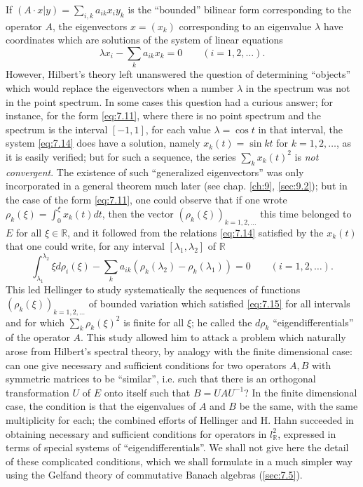 \documentclass[12pt,a4paper,leqno,twoside]{extbook}
\newcommand{\R}{\mathbb{R}}
\begin{document}
If \((A \cdot x|y) = \sum\limits_{i,k} a_{ik} x_i y_k\) is the ``bounded'' bilinear form corresponding to the operator \(A\), the eigenvectors \(x = (x_k)\) corresponding to an eigenvalue \(\lambda\) have coordinates which are solutions of the system of linear equations
\begin{equation}
    \label{eq:7.14}
    \lambda x_i - \sum_k a_{ik} x_k = 0 \qquad (i=1,2,\ldots).
\end{equation}
However, Hilbert's theory left unanswered the question of determining ``objects'' which would replace the eigenvectors when a number \(\lambda\) in the spectrum was not in the point spectrum. In some cases this question had a curious answer; for instance, for the form \eqref{eq:7.11}, where there is no point spectrum and the spectrum is the interval \([-1,1]\), for each value \(\lambda = \cos{t}\) in that interval, the system \eqref{eq:7.14} does have a solution, namely \(x_k(t) = \sin{kt}\) for \(k = 1, 2, \ldots\), as it is easily verified; but for such a sequence, the series \(\sum\limits_k x_k(t)^2\) is \emph{not convergent}. The existence of such ``generalized eigenvectors'' was only incorporated in a general theorem much later (see chap. \ref{ch:9}, \ref{sec:9.2}); but in the case of the form \eqref{eq:7.11}, one could observe that if one wrote \(\rho_k(\xi) = \int_0^\xi x_k(t)dt\), then the vector \((\rho_k(\xi))_{k=1,2,\ldots}\) this time belonged to \(E\) for all \(\xi \in \R\), and it followed from the relations \eqref{eq:7.14} satisfied by the \(x_k(t)\) that one could write, for any interval \([\lambda_1, \lambda_2]\) of \(\R\)
\begin{equation}
    \label{eq:7.15}
    \int_{\lambda_1}^{\lambda_2} \xi d\rho_i(\xi) - \sum_k a_{ik}(\rho_k(\lambda_2) - \rho_k(\lambda_1)) = 0 \qquad (i = 1, 2, \ldots).
\end{equation}
This led Hellinger \cite{105} to study systematically the sequences of functions \((\rho_k(\xi))_{k=1,2,\ldots}\) of bounded variation which satisfied \eqref{eq:7.15} for all intervals and for which \(\sum\limits_k \rho_k(\xi)^2\) is finite for all \(\xi\); he called the \(d\rho_k\) ``eigendifferentials'' of the operator \(A\). This study allowed him to attack a problem which naturally arose from Hilbert's spectral theory, by analogy with the finite dimensional case: can one give necessary and sufficient conditions for two operators \(A,B\) with symmetric matrices to be ``similar'', i.e. such that there is an orthogonal transformation \(U\) of \(E\) onto itself such that \(B = UAU^{-1}\)? In the finite dimensional case, the condition is that the eigenvalues of \(A\) and \(B\) be the same, with the same multiplicity for each; the combined efforts of Hellinger and H. Hahn \cite{095} succeeded in obtaining necessary and sufficient conditions for operators in \(l^2_{\R}\), expressed in terms of special systems of ``eigendifferentials''. We shall not give here the detail of these complicated conditions, which we shall formulate in a much simpler way using the Gelfand theory of commutative Banach algebras (\ref{sec:7.5}).
\end{document}
